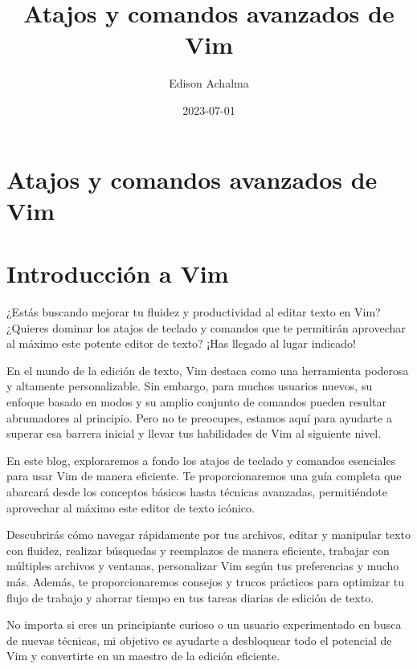 \documentclass[
  doc,
  floatsintext,
  longtable,
  a4paper,
  nolmodern,
  notxfonts,
  notimes,
  12pt,
  colorlinks=true,linkcolor=blue,citecolor=blue,urlcolor=blue]{apa7}
\title{Atajos y comandos avanzados de Vim}
\author{Edison Achalma}
\affiliation{
{Escuela Profesional de Economía, Universidad Nacional de San Cristóbal
de Huamanga}}
\date{2023-07-01}
\begin{document}
\maketitle


\hypertarget{toc}{}
\tableofcontents
\newpage
\section[Introduction]{Atajos y comandos avanzados de Vim}

\setcounter{secnumdepth}{3}

\setlength\LTleft{0pt}




\section{Introducción a Vim}\label{introducciuxf3n-a-vim}

¿Estás buscando mejorar tu fluidez y productividad al editar texto en
Vim? ¿Quieres dominar los atajos de teclado y comandos que te permitirán
aprovechar al máximo este potente editor de texto? ¡Has llegado al lugar
indicado!

En el mundo de la edición de texto, Vim destaca como una herramienta
poderosa y altamente personalizable. Sin embargo, para muchos usuarios
nuevos, su enfoque basado en modos y su amplio conjunto de comandos
pueden resultar abrumadores al principio. Pero no te preocupes, estamos
aquí para ayudarte a superar esa barrera inicial y llevar tus
habilidades de Vim al siguiente nivel.

En este blog, exploraremos a fondo los atajos de teclado y comandos
esenciales para usar Vim de manera eficiente. Te proporcionaremos una
guía completa que abarcará desde los conceptos básicos hasta técnicas
avanzadas, permitiéndote aprovechar al máximo este editor de texto
icónico.

Descubrirás cómo navegar rápidamente por tus archivos, editar y
manipular texto con fluidez, realizar búsquedas y reemplazos de manera
eficiente, trabajar con múltiples archivos y ventanas, personalizar Vim
según tus preferencias y mucho más. Además, te proporcionaremos consejos
y trucos prácticos para optimizar tu flujo de trabajo y ahorrar tiempo
en tus tareas diarias de edición de texto.

No importa si eres un principiante curioso o un usuario experimentado en
busca de nuevas técnicas, mi objetivo es ayudarte a desbloquear todo el
potencial de Vim y convertirte en un maestro de la edición eficiente.
\end{document}
